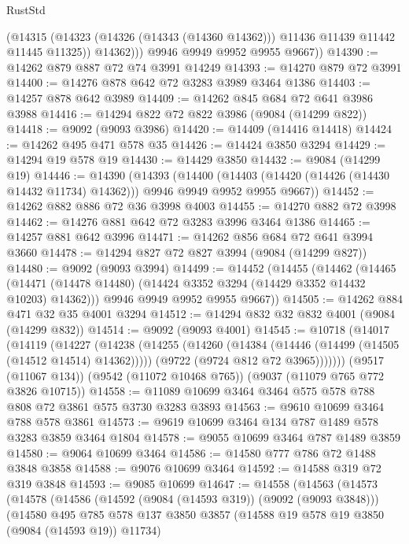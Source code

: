 \begin{lexlean}{RustStd}
\begin{coremodule}
              (@14315 (@14323 (@14326 (@14343 (@14360 @14362))) @11436 @11439 @11442 @11445 @11325))
              @14362)))
        @9946
        @9949
        @9952
        @9955
        @9667))
@14390 := @14262 @879 @887 @72 @74 @3991 @14249
@14393 := @14270 @879 @72 @3991
@14400 := @14276 @878 @642 @72 @3283 @3989 @3464 @1386
@14403 := @14257 @878 @642 @3989
@14409 := @14262 @845 @684 @72 @641 @3986 @3988
@14416 := @14294 @822 @72 @822 @3986 (@9084 (@14299 @822))
@14418 := @9092 (@9093 @3986)
@14420 := @14409 (@14416 @14418)
@14424 := @14262 @495 @471 @578 @35
@14426 := @14424 @3850 @3294
@14429 := @14294 @19 @578 @19
@14430 := @14429 @3850
@14432 := @9084 (@14299 @19)
@14446 := @14390
    (@14393
      (@14400
        (@14403 (@14420 (@14426 (@14430 @14432 @11734) @14362)))
        @9946
        @9949
        @9952
        @9955
        @9667))
@14452 := @14262 @882 @886 @72 @36 @3998 @4003
@14455 := @14270 @882 @72 @3998
@14462 := @14276 @881 @642 @72 @3283 @3996 @3464 @1386
@14465 := @14257 @881 @642 @3996
@14471 := @14262 @856 @684 @72 @641 @3994 @3660
@14478 := @14294 @827 @72 @827 @3994 (@9084 (@14299 @827))
@14480 := @9092 (@9093 @3994)
@14499 := @14452
    (@14455
      (@14462
        (@14465 (@14471 (@14478 @14480) (@14424 @3352 @3294 (@14429 @3352 @14432 @10203) @14362)))
        @9946
        @9949
        @9952
        @9955
        @9667))
@14505 := @14262 @884 @471 @32 @35 @4001 @3294
@14512 := @14294 @832 @32 @832 @4001 (@9084 (@14299 @832))
@14514 := @9092 (@9093 @4001)
@14545 := @10718
    (@14017
      (@14119
        (@14227
          (@14238
            (@14255
              (@14260 (@14384 (@14446 (@14499 (@14505 (@14512 @14514) @14362)))))
              (@9722 (@9724 @812 @72 @3965)))))))
    (@9517 (@11067 @134))
    (@9542 (@11072 @10468 @765))
    (@9037 (@11079 @765 @772 @3826 @10715))
@14558 := @11089 @10699 @3464 @3464 @575 @578 @788 @808 @72 @3861 @575 @3730 @3283 @3893
@14563 := @9610 @10699 @3464 @788 @578 @3861
@14573 := @9619 @10699 @3464 @134 @787 @1489 @578 @3283 @3859 @3464 @1804
@14578 := @9055 @10699 @3464 @787 @1489 @3859
@14580 := @9064 @10699 @3464
@14586 := @14580 @777 @786 @72 @1488 @3848 @3858
@14588 := @9076 @10699 @3464
@14592 := @14588 @319 @72 @319 @3848
@14593 := @9085 @10699
@14647 := @14558
    (@14563
      (@14573
        (@14578
          (@14586
            (@14592 (@9084 (@14593 @319)) (@9092 (@9093 @3848)))
            (@14580
              @495
              @785
              @578
              @137
              @3850
              @3857
              (@14588 @19 @578 @19 @3850 (@9084 (@14593 @19)) @11734)

\end{coremodule}
\end{lexlean}
